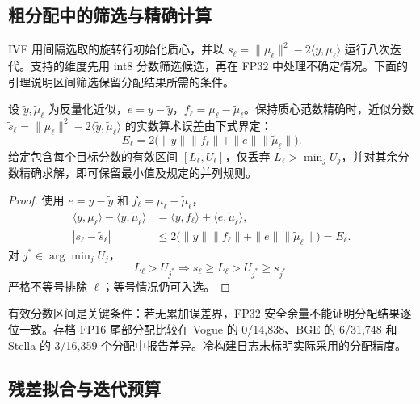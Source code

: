 \subsection{粗分配中的筛选与精确计算}

IVF 用间隔选取的旋转行初始化质心，并以 $s_\ell=\|\mu_\ell\|^2-2\langle y,\mu_\ell\rangle$ 运行八次迭代。支持的维度先用 int8 分数筛选候选，再在 FP32 中处理不确定情况。下面的引理说明区间筛选保留分配结果所需的条件。

\begin{resultblock}
\begin{lemma}[具有认证分数区间的分配]
\label{lem:4-assignment-bound}
设 $\widetilde y,\widetilde\mu_\ell$ 为反量化近似，$e=y-\widetilde y$，$f_\ell=\mu_\ell-\widetilde\mu_\ell$。保持质心范数精确时，近似分数
$\widetilde s_\ell=\|\mu_\ell\|^2-2\langle\widetilde y,\widetilde\mu_\ell\rangle$
的实数算术误差由下式界定：
\begin{equation}
 E_\ell=2\bigl(\|y\|\|f_\ell\|+\|e\|\|\widetilde\mu_\ell\|\bigr).
 \label{eq:4-assignment-bound}
\end{equation}
给定包含每个目标分数的有效区间 $[L_\ell,U_\ell]$，仅丢弃 $L_\ell>\min_j U_j$，并对其余分数精确求解，即可保留最小值及规定的并列规则。
\end{lemma}
\begin{proof}
使用 $e=y-\widetilde y$ 和 $f_\ell=\mu_\ell-\widetilde\mu_\ell$，
\[
 \begin{aligned}
 \langle y,\mu_\ell\rangle-
 \langle\widetilde y,\widetilde\mu_\ell\rangle
 &=\langle y,f_\ell\rangle
   +\langle e,\widetilde\mu_\ell\rangle,\\
 |s_\ell-\widetilde s_\ell|
 &\leq2\bigl(\|y\|\|f_\ell\|
       +\|e\|\|\widetilde\mu_\ell\|\bigr)=E_\ell .
 \end{aligned}
\]
对 $j^*\in\arg\min_j U_j$，
\[
 L_\ell>U_{j^*}
 \Longrightarrow
 s_\ell\geq L_\ell>U_{j^*}\geq s_{j^*}.
\]
严格不等号排除 $\ell$；等号情况仍可入选。
\end{proof}
\end{resultblock}

有效分数区间是关键条件：若无累加误差界，FP32 安全余量不能证明分配结果逐位一致。存档 FP16 尾部分配比较在 Vogue 的 0/14,838、BGE 的 6/31,748 和 Stella 的 3/16,359 个分配中报告差异。冷构建日志未标明实际采用的分配精度。

\subsection{残差拟合与迭代预算}

